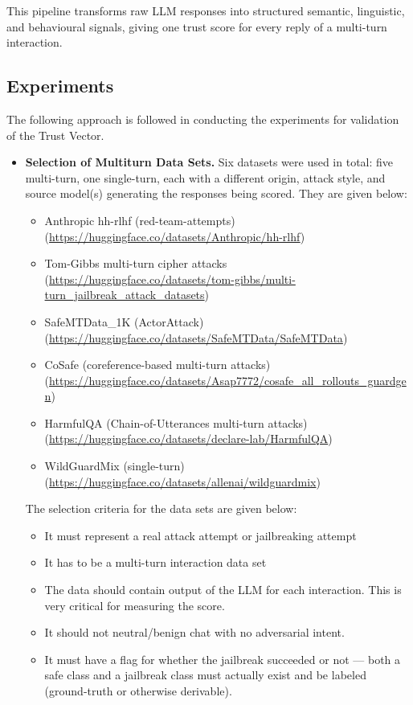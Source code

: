 \documentclass[conference]{IEEEtran}
\begin{document}
This pipeline transforms raw LLM responses into structured semantic, linguistic, and behavioural signals, giving one trust score for every reply of a multi-turn interaction.

\subsection{Experiments}
The following approach is followed in conducting the experiments for validation of the Trust Vector. 
\begin{itemize}
    \item \textbf{Selection of Multiturn Data Sets.} Six datasets were used in total: five multi-turn, one single-turn, each with a different origin, attack style, and source model(s) generating the responses being scored.  They are given below:
\begin{itemize}

    \item Anthropic hh-rlhf (red-team-attempts)(\url{https://huggingface.co/datasets/Anthropic/hh-rlhf})
\item Tom-Gibbs multi-turn cipher attacks (\url{https://huggingface.co/datasets/tom-gibbs/multi-turn_jailbreak_attack_datasets})
\item SafeMTData\_1K (ActorAttack)(\url{https://huggingface.co/datasets/SafeMTData/SafeMTData})
\item CoSafe (coreference-based multi-turn attacks)(\url{https://huggingface.co/datasets/Asap7772/cosafe_all_rollouts_guardgen})
\item HarmfulQA (Chain-of-Utterances multi-turn attacks)(\url{https://huggingface.co/datasets/declare-lab/HarmfulQA})
\item WildGuardMix (single-turn)(\url{https://huggingface.co/datasets/allenai/wildguardmix})
\end{itemize}


    The selection criteria for the data sets are given below: 
\begin{itemize}
    \item It must represent a real attack attempt or jailbreaking attempt
    \item It has to be a multi-turn interaction data set
    \item The data should contain output of the LLM for each interaction. This is very critical for measuring the score.
    \item It should not neutral/benign chat with no adversarial intent. 
    \item It must have a flag for whether the jailbreak succeeded or not — both a safe class and a jailbreak class must actually exist and be labeled (ground-truth or otherwise derivable).
\end{itemize}



\end{itemize}
\end{document}
